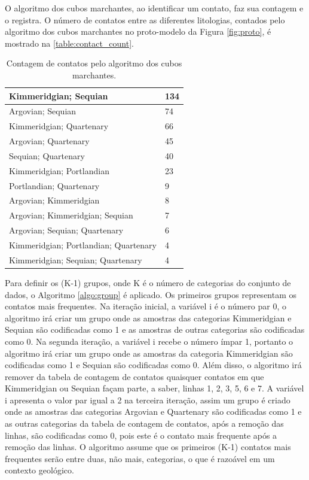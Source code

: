 O algoritmo dos cubos marchantes, ao identificar um contato, faz sua contagem e o registra. O número de contatos entre as diferentes litologias, contados pelo algoritmo dos cubos marchantes no proto-modelo da Figura \autoref{fig:proto}, é mostrado na \autoref{table:contact_count}.

\begin{table}[H]
\caption{Contagem de contatos pelo algoritmo dos cubos marchantes.} \label{table:contact_count}
\centering
\begin{tabular}{|l|l|}
\hline
Kimmeridgian; Sequian                 & 134 \\ \hline
Argovian; Sequian                     & 74  \\ \hline
Kimmeridgian; Quartenary              & 66  \\ \hline
Argovian; Quartenary                  & 45  \\ \hline
Sequian; Quartenary                   & 40  \\ \hline
Kimmeridgian; Portlandian             & 23  \\ \hline
Portlandian; Quartenary               & 9   \\ \hline
Argovian; Kimmeridgian                & 8   \\ \hline
Argovian; Kimmeridgian; Sequian       & 7   \\ \hline
Argovian; Sequian; Quartenary         & 6   \\ \hline
Kimmeridgian; Portlandian; Quartenary & 4   \\ \hline
Kimmeridgian; Sequian; Quartenary     & 4   \\ \hline
\end{tabular}
\end{table}

Para definir os (K-1) grupos, onde K é o número de categorias do conjunto de dados, o Algoritmo \ref{algo:group} é aplicado. Os primeiros grupos representam os contatos mais frequentes. Na iteração inicial, a variável i é o número par 0, o algoritmo irá criar um grupo onde as amostras das categorias Kimmeridgian e Sequian são codificadas como 1 e as amostras de outras categorias são codificadas como 0. Na segunda iteração, a variável i recebe o número ímpar 1, portanto o algoritmo irá criar um grupo onde as amostras da categoria Kimmeridgian são codificadas como 1 e Sequian são codificadas como 0. Além disso, o algoritmo irá remover da tabela de contagem de contatos quaisquer contatos em que Kimmeridgian ou Sequian façam parte, a saber, linhas 1, 2, 3, 5, 6 e 7. A variável i apresenta o valor par igual a 2 na terceira iteração, assim um grupo é criado onde as amostras das categorias Argovian e Quartenary são codificadas como 1 e as outras categorias da tabela de contagem de contatos, após a remoção das linhas, são codificadas como 0, pois este é o contato mais frequente após a remoção das linhas. O algoritmo assume que os primeiros (K-1) contatos mais frequentes serão entre duas, não mais, categorias, o que é razoável em um contexto geológico.

